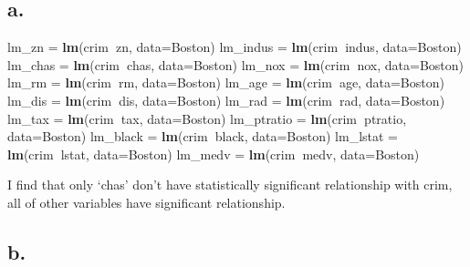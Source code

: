 \documentclass[]{article}
\newenvironment{Shaded}{\begin{snugshade}}{\end{snugshade}}
\newcommand{\DataTypeTok}[1]{\textcolor[rgb]{0.13,0.29,0.53}{#1}}
\newcommand{\KeywordTok}[1]{\textcolor[rgb]{0.13,0.29,0.53}{\textbf{#1}}}
\newcommand{\NormalTok}[1]{#1}
\newcommand{\OperatorTok}[1]{\textcolor[rgb]{0.81,0.36,0.00}{\textbf{#1}}}
\newcommand{\StringTok}[1]{\textcolor[rgb]{0.31,0.60,0.02}{#1}}
\begin{document}
\hypertarget{a.}{%
\subsection{a.}\label{a.}}

\begin{Shaded}
\begin{Highlighting}[]
\NormalTok{lm_zn =}\StringTok{ }\KeywordTok{lm}\NormalTok{(crim}\OperatorTok{~}\NormalTok{zn, }\DataTypeTok{data=}\NormalTok{Boston)}
\NormalTok{lm_indus =}\StringTok{ }\KeywordTok{lm}\NormalTok{(crim}\OperatorTok{~}\NormalTok{indus, }\DataTypeTok{data=}\NormalTok{Boston)}
\NormalTok{lm_chas =}\StringTok{ }\KeywordTok{lm}\NormalTok{(crim}\OperatorTok{~}\NormalTok{chas, }\DataTypeTok{data=}\NormalTok{Boston)}
\NormalTok{lm_nox =}\StringTok{ }\KeywordTok{lm}\NormalTok{(crim}\OperatorTok{~}\NormalTok{nox, }\DataTypeTok{data=}\NormalTok{Boston)}
\NormalTok{lm_rm =}\StringTok{ }\KeywordTok{lm}\NormalTok{(crim}\OperatorTok{~}\NormalTok{rm, }\DataTypeTok{data=}\NormalTok{Boston)}
\NormalTok{lm_age =}\StringTok{ }\KeywordTok{lm}\NormalTok{(crim}\OperatorTok{~}\NormalTok{age, }\DataTypeTok{data=}\NormalTok{Boston)}
\NormalTok{lm_dis =}\StringTok{ }\KeywordTok{lm}\NormalTok{(crim}\OperatorTok{~}\NormalTok{dis, }\DataTypeTok{data=}\NormalTok{Boston)}
\NormalTok{lm_rad =}\StringTok{ }\KeywordTok{lm}\NormalTok{(crim}\OperatorTok{~}\NormalTok{rad, }\DataTypeTok{data=}\NormalTok{Boston)}
\NormalTok{lm_tax =}\StringTok{ }\KeywordTok{lm}\NormalTok{(crim}\OperatorTok{~}\NormalTok{tax, }\DataTypeTok{data=}\NormalTok{Boston)}
\NormalTok{lm_ptratio =}\StringTok{ }\KeywordTok{lm}\NormalTok{(crim}\OperatorTok{~}\NormalTok{ptratio, }\DataTypeTok{data=}\NormalTok{Boston)}
\NormalTok{lm_black =}\StringTok{ }\KeywordTok{lm}\NormalTok{(crim}\OperatorTok{~}\NormalTok{black, }\DataTypeTok{data=}\NormalTok{Boston)}
\NormalTok{lm_lstat =}\StringTok{ }\KeywordTok{lm}\NormalTok{(crim}\OperatorTok{~}\NormalTok{lstat, }\DataTypeTok{data=}\NormalTok{Boston)}
\NormalTok{lm_medv =}\StringTok{ }\KeywordTok{lm}\NormalTok{(crim}\OperatorTok{~}\NormalTok{medv, }\DataTypeTok{data=}\NormalTok{Boston)}
\end{Highlighting}
\end{Shaded}

I find that only `chas' don't have statistically significant
relationship with crim, all of other variables have significant
relationship.

\hypertarget{b.}{%
\subsection{b.}\label{b.}}
\end{document}
